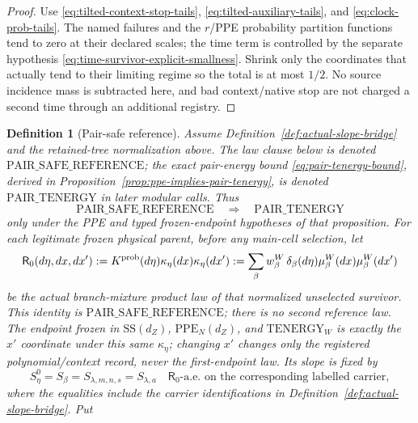 \documentclass[11pt]{article}
\newtheorem{definition}[theorem]{Definition}
\begin{document}
\begin{proof}
Use \eqref{eq:tilted-context-stop-tails},
\eqref{eq:tilted-auxiliary-tails}, and
\eqref{eq:clock-prob-tails}.  The named failures and the $r$/PPE probability
partition functions tend to zero at their declared scales; the time term is
controlled by the separate hypothesis
\eqref{eq:time-survivor-explicit-smallness}.  Shrink only the coordinates
that actually tend to their limiting regime so the total is at most $1/2$.
No source
incidence mass is subtracted here, and bad context/native stop are not
charged a second time through an additional registry.
\end{proof}

\begin{definition}[Pair-safe reference]
\label{def:pair-safe-reference}
Assume Definition~\ref{def:actual-slope-bridge} and the retained-tree
normalization above.  The law clause below is denoted
\(\mathrm{PAIR\_SAFE\_REFERENCE}\); the exact pair-energy bound
\eqref{eq:pair-tenergy-bound}, derived in
Proposition~\ref{prop:ppe-implies-pair-tenergy}, is denoted
\(\mathrm{PAIR\_TENERGY}\) in later modular calls.  Thus
\[
 \mathrm{PAIR\_SAFE\_REFERENCE}\quad\Longrightarrow\quad
 \mathrm{PAIR\_TENERGY}
\]
only under the PPE and typed frozen-endpoint hypotheses of that proposition.
For each
legitimate frozen physical parent, before
any main-cell selection, let
\begin{equation}
\label{eq:unselected-reference-law}
 \mathsf R_0(d\eta,dx,dx')
 :=K^{\rm prob}(d\eta)\kappa_\eta(dx)\kappa_\eta(dx')
 :=\sum_\beta w_\beta^W\,
   \delta_\beta(d\eta)\mu_\beta^W(dx)\mu_\beta^W(dx')
\end{equation}
be the actual branch-mixture product law of that normalized unselected
survivor.  This identity is $\mathrm{PAIR\_SAFE\_REFERENCE}$; there is no
second reference law.  The endpoint frozen in $\mathrm{SS}(d_Z)$,
$\mathrm{PPE}_{N}(d_Z)$, and $\mathrm{TENERGY}_{W}$ is exactly the
$x'$ coordinate under this same $\kappa_\eta$; changing $x'$ changes only
the registered polynomial/context record, never the first-endpoint law.
Its slope is fixed by
\begin{equation}
\label{eq:reference-slope-identification}
 S_\eta^0=S_\beta=S_{\lambda,m,n,s}=S_{\lambda,a}
 \quad \mathsf R_0\text{-a.e. on the corresponding labelled carrier},
\end{equation}
where the equalities include the carrier identifications in
Definition~\ref{def:actual-slope-bridge}.  Put
\begin{equation}
\label{eq:exact-reference-pair-event}

\end{equation}
\end{definition}
\end{document}
